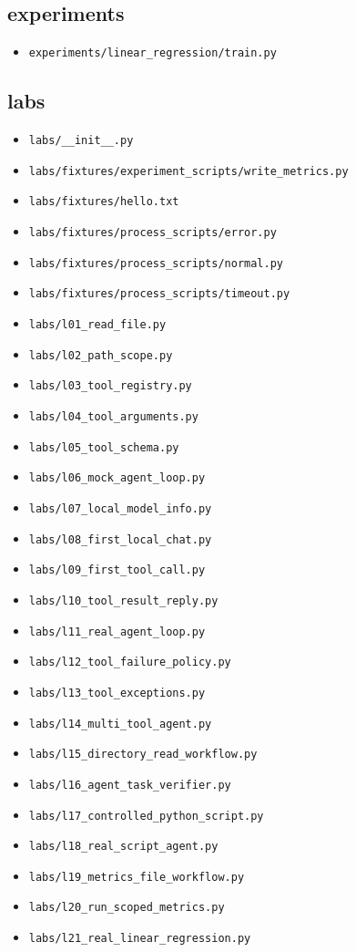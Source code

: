 \subsection{experiments}
\begin{itemize}
\item \nolinkurl{experiments/linear_regression/train.py}
\end{itemize}

\subsection{labs}
\begin{itemize}
\item \nolinkurl{labs/__init__.py}
\item \nolinkurl{labs/fixtures/experiment_scripts/write_metrics.py}
\item \nolinkurl{labs/fixtures/hello.txt}
\item \nolinkurl{labs/fixtures/process_scripts/error.py}
\item \nolinkurl{labs/fixtures/process_scripts/normal.py}
\item \nolinkurl{labs/fixtures/process_scripts/timeout.py}
\item \nolinkurl{labs/l01_read_file.py}
\item \nolinkurl{labs/l02_path_scope.py}
\item \nolinkurl{labs/l03_tool_registry.py}
\item \nolinkurl{labs/l04_tool_arguments.py}
\item \nolinkurl{labs/l05_tool_schema.py}
\item \nolinkurl{labs/l06_mock_agent_loop.py}
\item \nolinkurl{labs/l07_local_model_info.py}
\item \nolinkurl{labs/l08_first_local_chat.py}
\item \nolinkurl{labs/l09_first_tool_call.py}
\item \nolinkurl{labs/l10_tool_result_reply.py}
\item \nolinkurl{labs/l11_real_agent_loop.py}
\item \nolinkurl{labs/l12_tool_failure_policy.py}
\item \nolinkurl{labs/l13_tool_exceptions.py}
\item \nolinkurl{labs/l14_multi_tool_agent.py}
\item \nolinkurl{labs/l15_directory_read_workflow.py}
\item \nolinkurl{labs/l16_agent_task_verifier.py}
\item \nolinkurl{labs/l17_controlled_python_script.py}
\item \nolinkurl{labs/l18_real_script_agent.py}
\item \nolinkurl{labs/l19_metrics_file_workflow.py}
\item \nolinkurl{labs/l20_run_scoped_metrics.py}
\item \nolinkurl{labs/l21_real_linear_regression.py}
\end{itemize}

